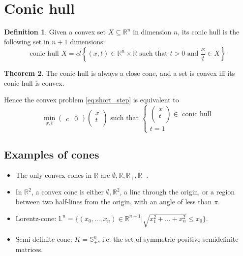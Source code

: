 \documentclass[12pt, openany]{report}
\newcommand{\R}{\mathbb{R}}
\theoremstyle{definition}
\newtheorem{thm}{Theorem}[chapter]
\newtheorem{definition}[thm]{Definition}
\begin{document}
\section{Conic hull}
\begin{definition}
    Given a convex set $X\subseteq \R^n$ in dimension $n$, its conic hull is the following set in $n+1$ dimensions:
    \begin{equation}
        \text{conic hull }X = cl\left\{(x,t)\in \R^n\times \R \text{ such that } t>0 \text{ and }\frac{x}{t}\in X\right\}
    \end{equation}
\end{definition}
\begin{thm}
    The conic hull is always a close cone, and a set is convex iff its conic hull is convex.
\end{thm}
Hence the convex problem \eqref{eq:short_step} is equivalent to 
\begin{equation}
    \min_{x,t} \begin{pmatrix}
        c & 0
    \end{pmatrix}\begin{pmatrix}
        x\\t \\
    \end{pmatrix} \text{ such that }
    \begin{cases}
        \begin{pmatrix} x \\t\\ \end{pmatrix}
        \in \text{ conic hull}\\
        t = 1    
    \end{cases}
\end{equation}
\subsection{Examples of cones}
\begin{itemize}
    \item The only convex cones in $\R$ are $\emptyset, \R,\R_+,\R_-$. 
    \item In $\R^2$, a convex cone is either $\emptyset, \R^2$, a line through the origin, or a region between two half-lines from the origin, with an angle of less than $\pi$. 
    \item Lorentz-cone: $\mathbb{L}^n = \{(x_0,\dots,x_n)\in \R^{n+1}|\sqrt{x_1^2+\dots+x_n^2}\le x_0\}$. 
    \item Semi-definite cone: $K=\mathbb{S}_+^n$, i.e. the set of symmetric positive semidefinite matrices. 
\end{itemize}
\end{document}
